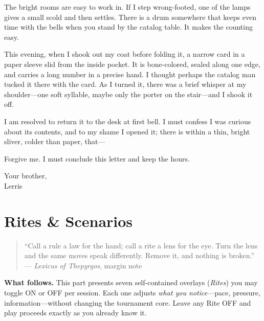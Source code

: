 \documentclass[11pt]{article}
\numberwithin{equation}{section} %
\theoremstyle{plain} %
\theoremstyle{definition} %
\theoremstyle{remark} %
\begin{document}
The bright rooms are easy to work in. If I step wrong-footed, one of the lamps gives a small scold and then settles. There is a drum somewhere that keeps even time with the bells when you stand by the catalog table. It makes the counting easy.

This evening, when I shook out my coat before folding it, a narrow card in a paper sleeve slid from the inside pocket. It is bone-colored, sealed along one edge, and carries a long number in a precise hand. I thought perhaps the catalog man tucked it there with the card. As I turned it, there was a brief whisper at my shoulder---one soft syllable, maybe only the porter on the stair---and I shook it off.

I am resolved to return it to the desk at first bell. I must confess I was curious about its contents, and to my shame I opened it; there is within a thin, bright sliver, colder than paper, that---

\medskip
\noindent Forgive me. I must conclude this letter and keep the hours.

\medskip
\noindent Your brother, \\
Lerris

\clearpage


\section{Rites \& Scenarios}
\label{part:rites}

\begin{quote}\small
``Call a rule a law for the hand; call a rite a lens for the eye.  
Turn the lens and the same moves speak differently. Remove it, and nothing is broken.''\\
\hfill --- \textit{Lexicus of Thepyrgos}, margin note
\end{quote}

\noindent\textbf{What follows.} This part presents seven self-contained overlays (\emph{Rites}) you may toggle \textsc{ON} or \textsc{OFF} per session. Each one adjusts \textit{what you notice}---pace, pressure, information---without changing the tournament core. Leave any Rite \textsc{OFF} and play proceeds exactly as you already know it.
\end{document}
